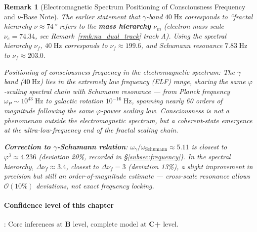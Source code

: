 \documentclass[12pt,a4paper,twocolumn]{article}
\renewcommand{\phi}{\varphi}
\newtheorem{remark}[theorem]{Remark}
\begin{document}
\begin{remark}[Electromagnetic Spectrum Positioning of Consciousness Frequency and $\nu$-Base Note]
\label{rmk:consciousness_spectrum}
The earlier statement that $\gamma$-band $40\;\text{Hz}$ corresponds to ``fractal hierarchy $\nu \approx 74$'' refers to the \textbf{mass hierarchy} $\nu_m$ (electron mass scale $\nu_e = 74.34$, see Remark~\ref{rmk:nu_dual_track} track A). Using the spectral hierarchy $\nu_f$, $40\;\text{Hz}$ corresponds to $\nu_f \approx 199.6$, and Schumann resonance $7.83\;\text{Hz}$ to $\nu_f \approx 203.0$.

Positioning of consciousness frequency in the electromagnetic spectrum: The $\gamma$ band ($40\;\text{Hz}$) lies in the extremely low frequency (ELF) range, sharing the same $\phi$-scaling spectral chain with Schumann resonance --- from Planck frequency $\omega_P \sim 10^{43}\;\text{Hz}$ to galactic rotation $10^{-16}\;\text{Hz}$, spanning nearly 60 orders of magnitude following the same $\phi$-power scaling law. Consciousness is not a phenomenon outside the electromagnetic spectrum, but a coherent-state emergence at the ultra-low-frequency end of the fractal scaling chain.

\textbf{Correction to $\gamma$-Schumann relation}: $\omega_\gamma/\omega_{\text{Schumann}} \approx 5.11$ is closest to $\phi^3 \approx 4.236$ (deviation 20\%, recorded in \S\ref{subsec:frequency}). In the spectral hierarchy, $\Delta\nu_f \approx 3.4$, closest to $\Delta\nu_f = 3$ (deviation 13\%), a slight improvement in precision but still an order-of-magnitude estimate --- cross-scale resonance allows $\mathcal{O}(10\%)$ deviations, not exact frequency locking.
\end{remark}

\paragraph{Confidence level of this chapter}: Core inferences at \textbf{B} level, complete model at \textbf{C+} level.
\end{document}
